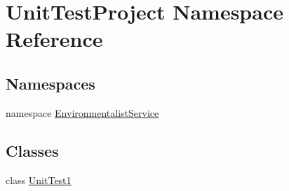 \hypertarget{namespace_unit_test_project}{}\section{Unit\+Test\+Project Namespace Reference}
\label{namespace_unit_test_project}
\subsection*{Namespaces}
\begin{DoxyCompactItemize}
\item 
namespace \hyperlink{namespace_unit_test_project_1_1_environmentalist_service}{Environmentalist\+Service}
\end{DoxyCompactItemize}
\subsection*{Classes}
\begin{DoxyCompactItemize}
\item 
class \hyperlink{class_unit_test_project_1_1_unit_test1}{Unit\+Test1}
\end{DoxyCompactItemize}
